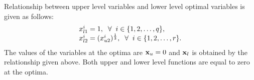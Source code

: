\documentclass[twoside]{article}
\begin{document}
Relationship between upper level variables and lower level optimal variables is given as follows:
\begin{equation}
\begin{array}{l}
x_{l1}^{i} = 1, \hspace{2mm} \forall \hspace{2mm} i \in \{1,2,\ldots,q\},\\
x_{l2}^{i} = (x_{u2}^{i})^{\frac{1}{3}}, \hspace{2mm} \forall \hspace{2mm} i \in \{1,2,\ldots,r\}.
\end{array}
\end{equation}
The values of the variables at the optima are $\mbox{$\mathbf{x}$}_u=0$ and $\mbox{$\mathbf{x}$}_l$ is obtained by the relationship given above. Both upper and lower level functions are equal to zero at the optima.
\end{document}
